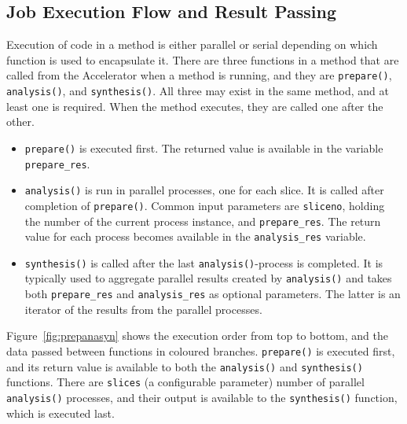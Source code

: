 




\subsection{Job Execution Flow and Result Passing}

Execution of code in a method is either parallel or serial depending
on which function is used to encapsulate it.  There are three
functions in a method that are called from the Accelerator when a
method is running, and they are \texttt{prepare()},
\texttt{analysis()}, and \texttt{synthesis()}.  All three may exist in
the same method, and at least one is required.  When the method
executes, they are called one after the other.
\begin{itemize}
\item[] \texttt{prepare()} is executed first.  The returned value is
  available in the variable \texttt{prepare\_res}.
\item[] \texttt{analysis()} is run in parallel processes, one for each
  slice.  It is called after completion of \texttt{prepare()}.  Common
  input parameters are \texttt{sliceno}, holding the number of the
  current process instance, and \texttt{prepare\_res}.  The return
  value for each process becomes available in the
  \texttt{analysis\_res} variable.
\item[] \texttt{synthesis()} is called after the last
  \texttt{analysis()}-process is completed.  It is typically used to
  aggregate parallel results created by \texttt{analysis()} and takes
  both \texttt{prepare\_res} and \texttt{analysis\_res} as optional
  parameters.  The latter is an iterator of the results from the
  parallel processes.
\end{itemize}
Figure~\ref{fig:prepanasyn} shows the execution order from top to
bottom, and the data passed between functions in coloured branches.
\texttt{prepare()} is executed first, and its return value is
available to both the \texttt{analysis()} and \texttt{synthesis()}
functions.  There are \texttt{slices} (a configurable parameter)
number of parallel \texttt{analysis()} processes, and their output is
available to the \texttt{synthesis()} function, which is executed
last.

